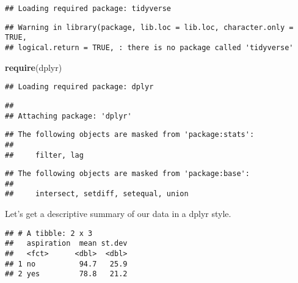 \documentclass[]{article}
\newenvironment{Shaded}{\begin{snugshade}}{\end{snugshade}}
\newcommand{\KeywordTok}[1]{\textcolor[rgb]{0.13,0.29,0.53}{\textbf{#1}}}
\newcommand{\DataTypeTok}[1]{\textcolor[rgb]{0.13,0.29,0.53}{#1}}
\newcommand{\StringTok}[1]{\textcolor[rgb]{0.31,0.60,0.02}{#1}}
\newcommand{\OperatorTok}[1]{\textcolor[rgb]{0.81,0.36,0.00}{\textbf{#1}}}
\newcommand{\NormalTok}[1]{#1}
\begin{document}
\begin{verbatim}
## Loading required package: tidyverse
\end{verbatim}

\begin{verbatim}
## Warning in library(package, lib.loc = lib.loc, character.only = TRUE,
## logical.return = TRUE, : there is no package called 'tidyverse'
\end{verbatim}

\begin{Shaded}
\begin{Highlighting}[]
\KeywordTok{require}\NormalTok{(dplyr)}
\end{Highlighting}
\end{Shaded}

\begin{verbatim}
## Loading required package: dplyr
\end{verbatim}

\begin{verbatim}
## 
## Attaching package: 'dplyr'
\end{verbatim}

\begin{verbatim}
## The following objects are masked from 'package:stats':
## 
##     filter, lag
\end{verbatim}

\begin{verbatim}
## The following objects are masked from 'package:base':
## 
##     intersect, setdiff, setequal, union
\end{verbatim}

Let's get a descriptive summary of our data in a dplyr style.

\begin{Shaded}
\end{Shaded}

\begin{verbatim}
## # A tibble: 2 x 3
##   aspiration  mean st.dev
##   <fct>      <dbl>  <dbl>
## 1 no          94.7   25.9
## 2 yes         78.8   21.2
\end{verbatim}
\end{document}
